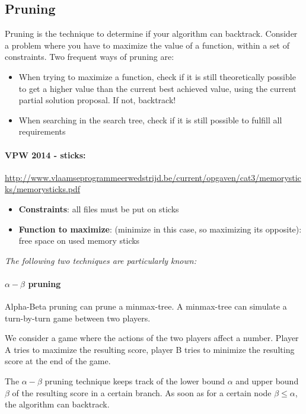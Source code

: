 \subsection{Pruning}
Pruning is the technique to determine if your algorithm can backtrack.
Consider a problem where you have to maximize the value of a function, within a set of constraints.
Two frequent ways of pruning are:
\begin{itemize}
\item{When trying to maximize a function, check if it is still theoretically possible to get a higher value than the current best achieved value, using the current partial solution proposal. If not, backtrack!}
\item{When searching in the search tree, check if it is still possible to fulfill all requirements}
\end{itemize}


\paragraph{VPW 2014 - sticks:}
\url{http://www.vlaamseprogrammeerwedstrijd.be/current/opgaven/cat3/memorysticks/memorysticks.pdf}
\begin{itemize}
 \item 
\textbf{Constraints}: all files must be put on sticks
\item \textbf{Function to maximize}: (minimize in this case, so maximizing its opposite): free space on used memory sticks

\end{itemize}




\emph{The following two techniques are particularly known:}
\paragraph{$\alpha-\beta$ pruning}

Alpha-Beta pruning can prune a minmax-tree. A minmax-tree can simulate a turn-by-turn game between two players.

We consider a game where the actions of the two players affect a number.
Player A tries to maximize the resulting score, player B tries to minimize the resulting score at the end of the game.

The $\alpha-\beta$ pruning technique keeps track of the lower bound $\alpha$ and upper bound $\beta$ of the resulting score in a certain branch. As soon as for a certain node $\beta \leq \alpha$, the algorithm can backtrack.

